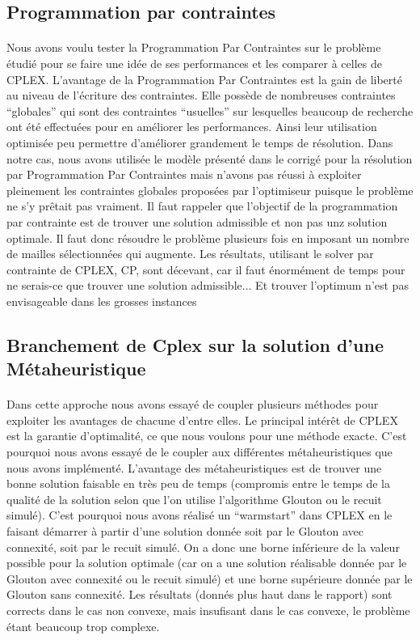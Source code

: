 \documentclass[a4paper, 11pt]{article} %
\begin{document}
\subsection{Programmation par contraintes}

\paragraph*{}
Nous avons voulu tester la Programmation Par Contraintes sur le problème étudié pour se faire une idée de ses performances et les comparer à celles de CPLEX. L'avantage de la Programmation Par Contraintes est la gain de liberté au niveau de l'écriture des contraintes. Elle possède de nombreuses contraintes ``globales'' qui sont des contraintes ``usuelles'' sur lesquelles beaucoup de recherche ont été effectuées pour en améliorer les performances. Ainsi leur utilisation optimisée peu permettre d'améliorer grandement le temps de résolution. Dans notre cas, nous avons utilisée le modèle présenté dans le corrigé pour la résolution par Programmation Par Contraintes mais n'avons pas réussi à exploiter pleinement les contraintes globales proposées par l'optimiseur puisque le problème ne s'y prêtait pas vraiment. Il faut rappeler que l'objectif de la programmation par contrainte est de trouver une solution admissible et non pas unz solution optimale. Il faut donc résoudre le problème plusieurs fois en imposant un nombre de mailles sélectionnées qui augmente. Les résultats, utilisant le solver par contrainte de CPLEX, CP, sont décevant, car il faut énormément de temps pour ne serais-ce que trouver une solution admissible... Et trouver l'optimum n'est pas envisageable dans les grosses instances

\subsection{Branchement de Cplex sur la solution d'une Métaheuristique}

\paragraph*{}
Dans cette approche nous avons essayé de coupler plusieurs méthodes pour exploiter les avantages de chacune d'entre elles. Le principal intérêt de CPLEX est la garantie d'optimalité, ce que nous voulons pour une méthode exacte. C'est pourquoi nous avons essayé de le coupler aux différentes métaheuristiques que nous avons implémenté. L'avantage des métaheuristiques est de trouver une bonne solution faisable en très peu de temps (compromis entre le temps de la qualité de la solution selon que l'on utilise l'algorithme Glouton ou le recuit simulé). C'est pourquoi nous avons réalisé un ``warmstart'' dans CPLEX en le faisant démarrer à partir d'une solution donnée soit par le Glouton avec connexité, soit par le recuit simulé. On a donc une borne inférieure de la valeur possible pour la solution optimale (car on a une solution réalisable donnée par le Glouton avec connexité ou le recuit simulé) et une borne supérieure donnée par le Glouton sans connexité. Les résultats (donnés plus haut dans le rapport) sont corrects dans le cas non convexe, mais insufisant dans le cas convexe, le problème étant beaucoup trop complexe.
\end{document}
